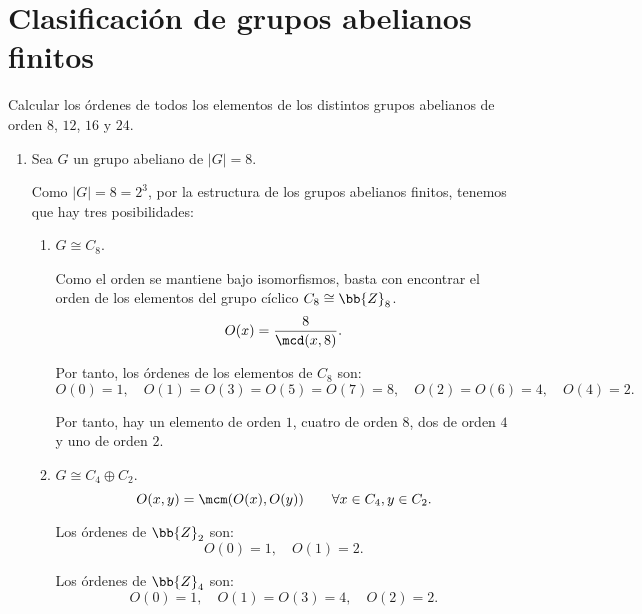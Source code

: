 \section{Clasificación de grupos abelianos finitos}

\begin{ejercicio}\label{ej:7.1}
    Calcular los órdenes de todos los elementos de los distintos grupos abelianos de orden $8$, $12$, $16$ y $24$.
    \begin{enumerate}
        \item Sea $G$ un grupo abeliano de $|G| = 8$.
        
        Como $|G|=8=2^3$, por la estructura de los grupos abelianos finitos, tenemos que hay tres posibilidades:
        \begin{enumerate}
            \item $G \cong C_8$.
            
            Como el orden se mantiene bajo isomorfismos, basta con encontrar el orden de los elementos del grupo cíclico $C_8\cong \bb{Z}_8$.
            \begin{equation*}
                O(x) = \frac{8}{\mcd(x, 8)}.
            \end{equation*}

            Por tanto, los órdenes de los elementos de $C_8$ son:
            \begin{equation*}
                O(0) = 1, \quad
                O(1) = O(3) = O(5) = O(7) = 8, \quad
                O(2) = O(6) = 4, \quad
                O(4) = 2.
            \end{equation*}

            Por tanto, hay un elemento de orden $1$, cuatro de orden $8$, dos de orden $4$ y uno de orden $2$.

            \item $G \cong C_4 \oplus C_2$.
            \begin{equation*}
                O(x, y) = \mcm(O(x), O(y))\qquad \forall x \in C_4, y \in C_2.
            \end{equation*}

            Los órdenes de $\bb{Z}_2$ son:
            \begin{equation*}
                O(0) = 1, \quad O(1) = 2.
            \end{equation*}

            Los órdenes de $\bb{Z}_4$ son:
            \begin{equation*}
                O(0) = 1, \quad O(1) = O(3) = 4, \quad O(2) = 2.
            \end{equation*}


\end{enumerate}
\end{enumerate}
\end{ejercicio}
